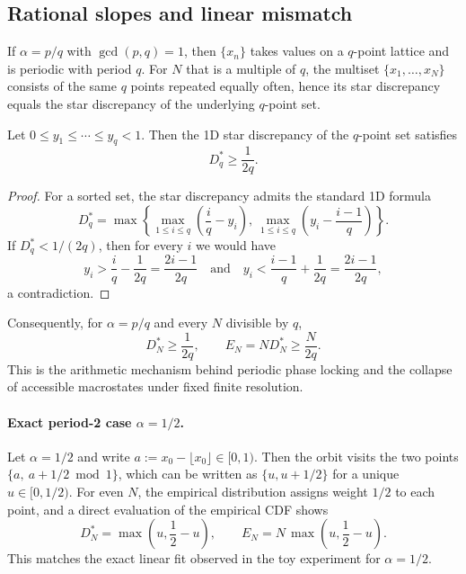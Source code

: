 \subsection{Rational slopes and linear mismatch}

If $\alpha=p/q$ with $\gcd(p,q)=1$, then $\{x_n\}$ takes values on a $q$-point lattice and is periodic with period $q$. For $N$ that is a multiple of $q$, the multiset $\{x_1,\dots,x_N\}$ consists of the same $q$ points repeated equally often, hence its star discrepancy equals the star discrepancy of the underlying $q$-point set.

\begin{lemma}
\label{lem:star_disc_lower}
Let $0\le y_1\le \cdots \le y_q < 1$. Then the 1D star discrepancy of the $q$-point set satisfies
\begin{equation}
  D_q^\ast \ge \frac{1}{2q}.
\end{equation}
\end{lemma}
\begin{proof}
For a sorted set, the star discrepancy admits the standard 1D formula
\[
  D_q^\ast=\max\!\left\{\max_{1\le i\le q}\left(\frac{i}{q}-y_i\right),\ \max_{1\le i\le q}\left(y_i-\frac{i-1}{q}\right)\right\}.
\]
If $D_q^\ast < 1/(2q)$, then for every $i$ we would have
\[
  y_i > \frac{i}{q}-\frac{1}{2q}=\frac{2i-1}{2q}
  \quad\text{and}\quad
  y_i < \frac{i-1}{q}+\frac{1}{2q}=\frac{2i-1}{2q},
\]
a contradiction.
\end{proof}

\noindent Consequently, for $\alpha=p/q$ and every $N$ divisible by $q$,
\begin{equation}
  D_N^\ast \ge \frac{1}{2q},
  \qquad
  E_N = N D_N^\ast \ge \frac{N}{2q}.
\end{equation}
This is the arithmetic mechanism behind periodic phase locking and the collapse of accessible macrostates under fixed finite resolution.

\paragraph{Exact period-2 case $\alpha=1/2$.}
Let $\alpha=1/2$ and write $a:=x_0-\lfloor x_0\rfloor\in[0,1)$. Then the orbit visits the two points $\{a,\ a+1/2 \bmod 1\}$, which can be written as $\{u, u+1/2\}$ for a unique $u\in[0,1/2)$. For even $N$, the empirical distribution assigns weight $1/2$ to each point, and a direct evaluation of the empirical CDF shows
\begin{equation}
  D_N^\ast = \max\!\left(u,\frac{1}{2}-u\right),
  \qquad
  E_N = N\,\max\!\left(u,\frac{1}{2}-u\right).
\end{equation}
This matches the exact linear fit observed in the toy experiment for $\alpha=1/2$.


